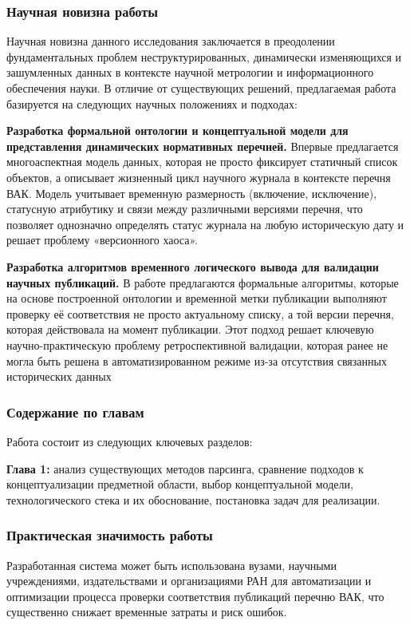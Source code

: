 \subsubsection*{Научная новизна работы}

Научная новизна данного исследования заключается в преодолении фундаментальных проблем неструктурированных, 
динамически изменяющихся и зашумленных данных в контексте научной метрологии и информационного обеспечения науки. 
В отличие от существующих решений, предлагаемая работа базируется на следующих научных положениях и подходах:

\begin{compactenum}
	\item \textbf{Разработка формальной онтологии и концептуальной модели для представления динамических нормативных перечней.} 
		Впервые предлагается многоаспектная модель данных, которая не просто фиксирует статичный список объектов, 
		а описывает жизненный цикл научного журнала в контексте перечня ВАК. 
		Модель учитывает временную размерность (включение, исключение), 
		статусную атрибутику и связи между различными версиями перечня, что позволяет однозначно определять 
		статус журнала на любую историческую дату и решает проблему «версионного хаоса».
	\item \textbf{Разработка алгоритмов временного логического вывода для валидации научных публикаций.} 
		В работе предлагаются формальные алгоритмы, которые на основе построенной онтологии и временной метки публикации 
		выполняют проверку её соответствия не просто актуальному списку, а той версии перечня, которая действовала на момент 
		публикации. Этот подход решает ключевую научно-практическую проблему ретроспективной валидации, которая ранее не могла 
		быть решена в автоматизированном режиме из-за отсутствия связанных исторических данных
\end{compactenum}

\subsubsection*{Содержание по главам}
Работа состоит из следующих ключевых разделов:

\begin{compactenum}
	\item \textbf{Глава 1:} анализ существующих методов парсинга, 
	сравнение подходов к концептуализации предметной области, выбор концептуальной модели, 
	технологического стека и их обоснование, постановка задач для реализации.
\end{compactenum}

\subsubsection*{Практическая значимость работы}
Разработанная система может быть использована вузами, научными учреждениями, издательствами 
и организациями РАН для автоматизации и оптимизации процесса проверки 
соответствия публикаций перечню ВАК, что существенно снижает временные затраты
и риск ошибок.


